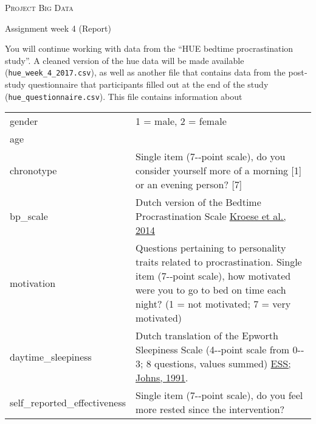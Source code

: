 \documentclass[a4paper]{report}
\theoremstyle{definition}
\newcommand{\blankline}{\par\vspace{5mm}}
\begin{document}
\begin{center}
    \textsc{\Large Project Big Data}
    \blankline
    
    {\large Assignment week 4 (Report)}
\end{center}

You will continue working with data from the ``HUE bedtime procrastination
study''. A cleaned version of the hue data will be made available
(\texttt{\small hue\_week\_4\_2017.csv}), as well as another file that
contains data from the post‐study questionnaire that participants filled
out at the end of the study (\texttt{\small hue\_questionnaire.csv}). This
file contains information about

\medskip
\begin{tabular}{|l|p{}|}
\hline
gender  & 1 = male, 2 = female \\

age & \\

chronotype  & Single item (7-­‐point scale), do you consider yourself
	more of a morning [1] or an evening person? [7] \\

bp\_scale  & Dutch version of the Bedtime Procrastination Scale
\href{http://selfregulationlab.nl/wp-content/uploads/2012/04/J-Health-Psychol-2016-Kroese-853-62.pdf }{Kroese et al., 2014} \\

motivation  & Questions pertaining to personality traits related to
	procrastination. Single item (7-­‐point scale), how motivated
	were you to go to bed on time each night? (1 = not motivated;
	7 = very motivated) \\

daytime\_sleepiness  & Dutch translation of the Epworth Sleepiness Scale
	(4-­‐point scale from 0-­‐3; 8 questions, values summed)
	\href{http://www.mwjohns.com/wp-content/uploads/2009/murray\_papers/a\_new\_method\_for\_measure\_daytime\_sleepiness\_the\_epworth\_sleepiness\_scale.pdf}{ESS; Johns, 1991}. \\

self\_reported\_effectiveness  & Single item (7-­‐point scale), do you feel
	more rested since the intervention? \\
\hline
\end{tabular}
\medskip
\end{document}
